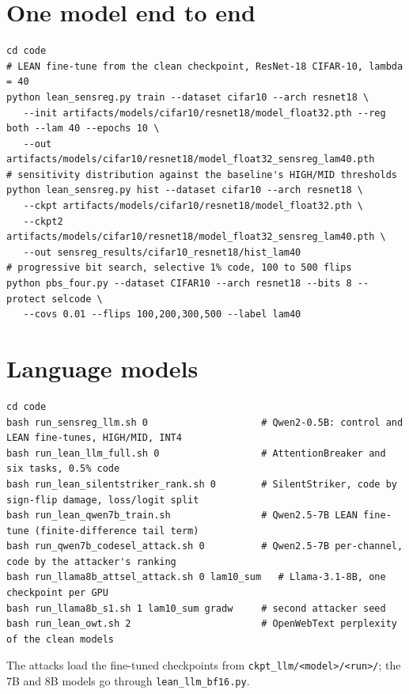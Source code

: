 \documentclass[11pt]{article}
\begin{document}
\section{One model end to end}
\begin{lstlisting}
cd code
# LEAN fine-tune from the clean checkpoint, ResNet-18 CIFAR-10, lambda = 40
python lean_sensreg.py train --dataset cifar10 --arch resnet18 \
   --init artifacts/models/cifar10/resnet18/model_float32.pth --reg both --lam 40 --epochs 10 \
   --out artifacts/models/cifar10/resnet18/model_float32_sensreg_lam40.pth
# sensitivity distribution against the baseline's HIGH/MID thresholds
python lean_sensreg.py hist --dataset cifar10 --arch resnet18 \
   --ckpt artifacts/models/cifar10/resnet18/model_float32.pth \
   --ckpt2 artifacts/models/cifar10/resnet18/model_float32_sensreg_lam40.pth \
   --out sensreg_results/cifar10_resnet18/hist_lam40
# progressive bit search, selective 1% code, 100 to 500 flips
python pbs_four.py --dataset CIFAR10 --arch resnet18 --bits 8 --protect selcode \
   --covs 0.01 --flips 100,200,300,500 --label lam40
\end{lstlisting}

\section{Language models}
\begin{lstlisting}
cd code
bash run_sensreg_llm.sh 0                    # Qwen2-0.5B: control and LEAN fine-tunes, HIGH/MID, INT4
bash run_lean_llm_full.sh 0                  # AttentionBreaker and six tasks, 0.5% code
bash run_lean_silentstriker_rank.sh 0        # SilentStriker, code by sign-flip damage, loss/logit split
bash run_lean_qwen7b_train.sh                # Qwen2.5-7B LEAN fine-tune (finite-difference tail term)
bash run_qwen7b_codesel_attack.sh 0          # Qwen2.5-7B per-channel, code by the attacker's ranking
bash run_llama8b_attsel_attack.sh 0 lam10_sum   # Llama-3.1-8B, one checkpoint per GPU
bash run_llama8b_s1.sh 1 lam10_sum gradw     # second attacker seed
bash run_lean_owt.sh 2                       # OpenWebText perplexity of the clean models
\end{lstlisting}
The attacks load the fine-tuned checkpoints from \texttt{ckpt\_llm/<model>/<run>/}; the 7B and 8B models go through \texttt{lean\_llm\_bf16.py}.
\end{document}

